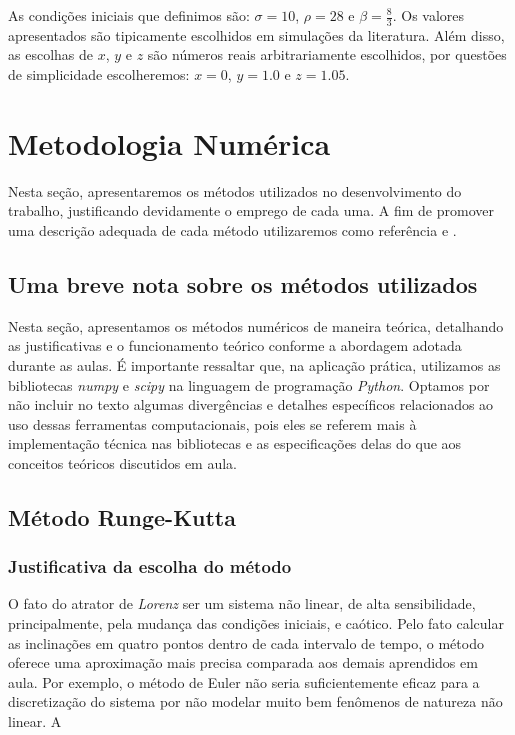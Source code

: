 \documentclass[12pt, a4paper]{article}
\begin{document}
    As condições iniciais que definimos são: $\sigma = 10$, $\rho = 28$ e
    $\beta = \frac{8}{3}$. Os valores apresentados são tipicamente escolhidos em
    simulações da literatura. Além disso, as escolhas de $x$, $y$ e $z$ são números
    reais arbitrariamente escolhidos, por questões de simplicidade escolheremos: $x
        = 0$, $y=1.0$ e $z=1.05$.
    \newpage
    
    
    \section{Metodologia Numérica}
    Nesta seção, apresentaremos os métodos utilizados no desenvolvimento do
    trabalho, justificando devidamente o emprego de cada uma. A fim de promover uma
    descrição adequada de cada método utilizaremos como referência \cite{roma2023}
    e \cite{burden2016}.
    
    \subsection{Uma breve nota sobre os métodos utilizados}
    Nesta seção, apresentamos os métodos numéricos de maneira teórica,
    detalhando as justificativas e o funcionamento teórico conforme a abordagem
    adotada durante as aulas. É importante ressaltar que, na aplicação prática,
    utilizamos as bibliotecas \textit{numpy} e \textit{scipy} na linguagem de
    programação \textit{Python}. Optamos por não incluir no texto algumas
    divergências e detalhes específicos relacionados ao uso dessas ferramentas
    computacionais, pois eles se referem mais à implementação técnica nas
    bibliotecas e as especificações delas do que aos conceitos teóricos discutidos
    em aula.
    
    \subsection{Método Runge-Kutta}
    \subsubsection{Justificativa da escolha do método}
    O fato do atrator de \textit{Lorenz} ser um sistema não linear, de alta
    sensibilidade, principalmente, pela mudança das condições iniciais, e caótico.
    Pelo fato calcular as inclinações em quatro pontos dentro de cada intervalo de
    tempo, o método oferece uma aproximação mais precisa comparada aos demais
    aprendidos em aula. Por exemplo, o método de Euler não seria suficientemente
    eficaz para a discretização do sistema por não modelar muito bem fenômenos de
    natureza não linear. A
    
\end{document}
